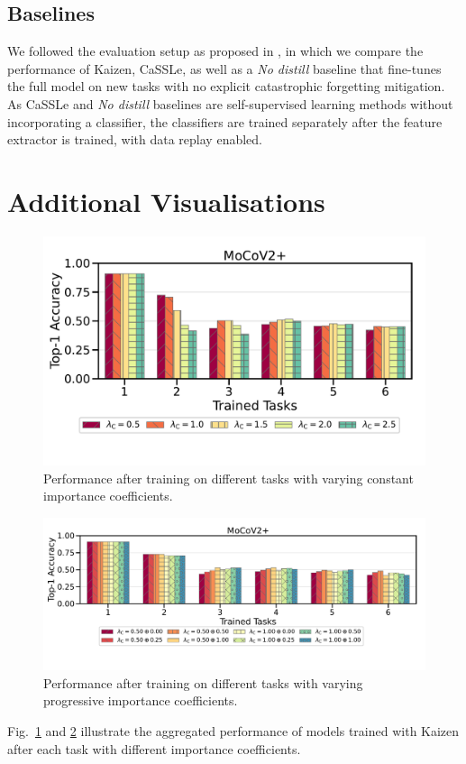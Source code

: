 \begin{appendix}
{\subsection{Baselines}
\label{subsection:baselines}
We followed the evaluation setup as proposed in \cite{tang2023practical}, in which we compare the performance of Kaizen, CaSSLe, as well as a \emph{No distill} baseline that fine-tunes the full model on new tasks with no explicit catastrophic forgetting mitigation. As CaSSLe and \emph{No distill} baselines are self-supervised learning methods without incorporating a classifier, the classifiers are trained separately after the feature extractor is trained, with data replay enabled.
}
\end{appendix}

\section{Additional Visualisations}
\label{subsection:additional_results}
\begin{figure}
    \centering
    \includegraphics[width=0.8 \linewidth ]{figures_new/Part_2/F3-WISDM2019-MoCoV2+-6Tasks-v2.pdf}
    \caption{Performance after training on different tasks with varying constant importance coefficients.}
\label{fig:kaizen_performance_across_time_constant_lamb}
\end{figure}


\begin{figure}
    \centering
    \includegraphics[width=0.99 \linewidth ]{figures_new/Part_3/F3-WISDM2019-MoCoV2+-6Tasks-v2.pdf}
    \caption{Performance after training on different tasks with varying progressive importance coefficients.}
\label{fig:kaizen_performance_across_time_progressive_lamb}
\end{figure}

Fig.~\ref{fig:kaizen_performance_across_time_constant_lamb} and \ref{fig:kaizen_performance_across_time_progressive_lamb} illustrate the aggregated performance of models trained with Kaizen after each task with different importance coefficients.

